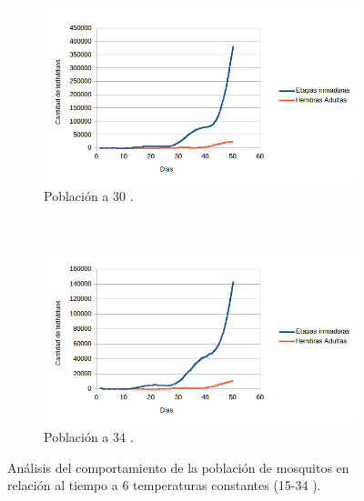 \begin{figure}[!htbp]
    \begin{subfigure}[b]{0.45\textwidth}
            \includegraphics[width=\textwidth]{capitulo-6/graphics/desarrollo-poblacion-30.png}
            \caption{\label{fig:desarrollo-poblacion-30}Población a 30 \textcelsius.}
    \end{subfigure}
    ~~~~
    \begin{subfigure}[b]{0.45\textwidth}
            \includegraphics[width=\textwidth]{capitulo-6/graphics/desarrollo-poblacion-34.png}
            \caption{\label{fig:desarrollo-poblacion-34}Población a 34 \textcelsius.}
    \end{subfigure}

    \caption{\label{fig:desarrollo-poblacion-all} Análisis del comportamiento de la población de mosquitos en relación al tiempo a 6 temperaturas constantes (15-34 \textcelsius).}
\end{figure}

